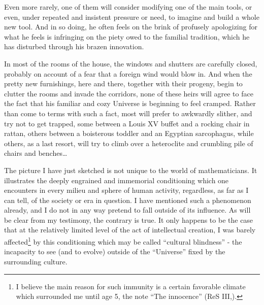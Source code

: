 Even more rarely, one of them will consider 
modifying one of the main tools, or even, 
under repeated and insistent pressure or need, to imagine and build a whole new tool. 
And in so doing, he often feels on the brink of profusely apologizing for what he feels is
infringing on the piety owed to the familial tradition, which he has disturbed through his
brazen innovation. 

In most of the rooms of the house, the windows and shutters are carefully closed, probably
on account of a fear that a foreign wind would blow in.
And when the pretty new furnishings, here and there, together with their progeny, begin to
clutter the rooms and invade the corridors, none of these heirs will agree to face the
fact that his familiar and cozy Universe is beginning to feel cramped.
Rather than come to terms with such a fact, most will prefer to 
awkwardly slither,
and try not to get trapped, some between a Louis XV buffet and a
rocking chair in rattan, others between a boisterous toddler
and an Egyptian sarcophagus, while others, as a last resort, will try to climb over a
heteroclite and crumbling pile of chairs and benches\ldots

The picture I have just sketched is not unique to the world of mathematicians. It
illustrates the deeply engrained and immemorial conditioning which 
one encounters in every milieu and sphere of human activity, regardless, as far as I can
tell, of the society or era in question.
I have mentioned such a phenomenon already, and I do not in any way pretend to fall
outside of its influence. 
As will be clear from my testimony, the contrary is true.
It only happens to be the case that at the relatively limited level of the act of
intellectual creation, I was barely affected\footnote{I believe the main reason for such
immunity is a certain favorable climate which surrounded me until age 5, the note ``The
innocence'' (ReS III,).
} by this conditioning which may be called 
``cultural blindness'' - the incapacity to see (and to evolve) outside of the ``Universe''
fixed by the surrounding culture.

